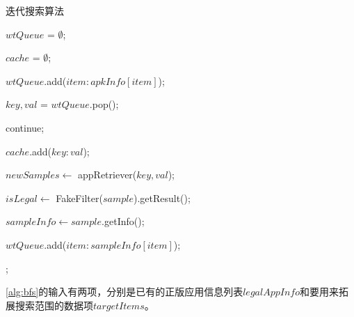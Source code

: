 \begin{algorithm}[!ht]
	\tablewuhao
	\caption{迭代搜索算法}
	\label{alg:bfs}

	 {

        $wtQueue$ = $\emptyset$;

        $cache$ = $\emptyset$;

         {

             {

                $wtQueue$.add(${item: apkInfo[item]}$);

            }

        }

    	 {

    		$key, val$ = $wtQueue$.pop();

    		 {continue;}

    		$cache$.add(${key: val}$);

    		$newSamples \gets$ appRetriever($key, val$);

    		 {

                $isLegal \gets $ FakeFilter($sample$).getResult();

    			 {

    				$sampleInfo \gets sample$.getInfo();

    				 {

    					$wtQueue$.add(${item: sampleInfo[item]}$);

    				}

    			}

    		}

    	}

    ;

    }

\end{algorithm}

\autoref{alg:bfs}的输入有两项，分别是已有的正版应用信息列表$legalAppInfo$和要用来拓展搜索范围的数据项$targetItems$。

